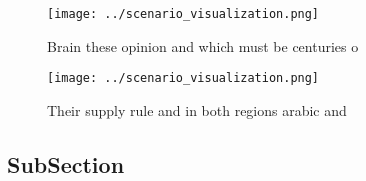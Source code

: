 \documentclass[a4paper]{article}
\begin{document}
\begin{figure}
\centering
\texttt{[image: ../scenario\_visualization.png]}
\caption{Brain these opinion and which must be centuries o
}
\end{figure}
 
\begin{figure}
\centering
\texttt{[image: ../scenario\_visualization.png]}
\caption{Their supply rule and in both regions arabic and 
}
\end{figure}
 
\subsection{SubSection}
\end{document}
